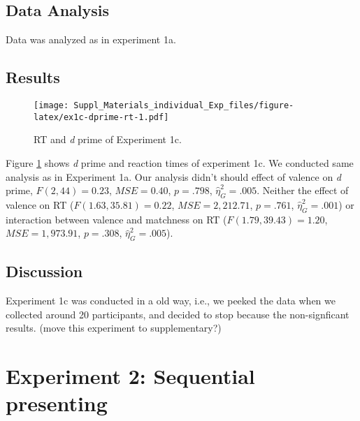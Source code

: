 \documentclass[man]{apa6}
\begin{document}
\hypertarget{data-analysis-2}{%
\subsection{Data Analysis}\label{data-analysis-2}}

Data was analyzed as in experiment 1a.

\hypertarget{results-2}{%
\subsection{Results}\label{results-2}}

\begin{figure}
\centering
\texttt{[image: Suppl\_Materials\_individual\_Exp\_files/figure-latex/ex1c-dprime-rt-1.pdf]}
\caption{\label{fig:ex1c-dprime-rt}RT and \emph{d} prime of Experiment 1c.}
\end{figure}

Figure \ref{fig:ex1c-dprime-rt} shows \emph{d} prime and reaction times of experiment 1c. We conducted same analysis as in Experiment 1a. Our analysis didn't should effect of valence on \emph{d} prime, \(F(2, 44) = 0.23\), \(\mathit{MSE} = 0.40\), \(p = .798\), \(\hat{\eta}^2_G = .005\). Neither the effect of valence on RT (\(F(1.63, 35.81) = 0.22\), \(\mathit{MSE} = 2,212.71\), \(p = .761\), \(\hat{\eta}^2_G = .001\)) or interaction between valence and matchness on RT (\(F(1.79, 39.43) = 1.20\), \(\mathit{MSE} = 1,973.91\), \(p = .308\), \(\hat{\eta}^2_G = .005\)).

\hypertarget{discussion-1}{%
\subsection{Discussion}\label{discussion-1}}

Experiment 1c was conducted in a old way, i.e., we peeked the data when we collected around 20 participants, and decided to stop because the non-signficant results. (move this experiment to supplementary?)

\hypertarget{experiment-2-sequential-presenting}{%
\section{Experiment 2: Sequential presenting}\label{experiment-2-sequential-presenting}}
\end{document}
